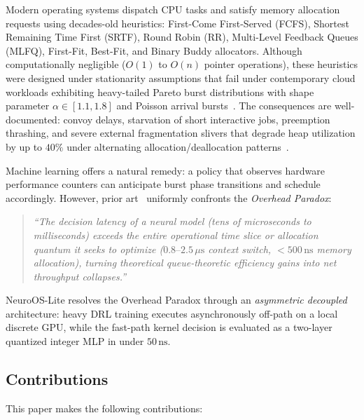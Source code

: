 Modern operating systems dispatch CPU tasks and satisfy memory allocation
requests using decades-old heuristics: First-Come First-Served (FCFS),
Shortest Remaining Time First (SRTF), Round Robin (RR), Multi-Level Feedback
Queues (MLFQ), First-Fit, Best-Fit, and Binary Buddy allocators. Although
computationally negligible ($O(1)$ to $O(n)$ pointer operations), these
heuristics were designed under stationarity assumptions that fail under
contemporary cloud workloads exhibiting heavy-tailed Pareto burst distributions
with shape parameter $\alpha \in [1.1, 1.8]$ and Poisson arrival
bursts~\cite{Tsafrir2007,Arpaci2018}. The consequences are well-documented:
convoy delays, starvation of short interactive jobs, preemption thrashing, and
severe external fragmentation slivers that degrade heap utilization by up to
$40\%$ under alternating allocation/deallocation
patterns~\cite{Wilson1995,Johnstone1998}.

Machine learning offers a natural remedy: a policy that observes hardware
performance counters can anticipate burst phase transitions and schedule
accordingly. However, prior art~\cite{Mao2019,Decima2019,Stratos2020}
uniformly confronts the \emph{Overhead Paradox}:

\begin{quote}
\textit{``The decision latency of a neural model (tens of microseconds to
milliseconds) exceeds the entire operational time slice or allocation quantum
it seeks to optimize ($0.8\text{--}2.5\,\mu\text{s}$ context switch,
$<500\,\text{ns}$ memory allocation), turning theoretical queue-theoretic
efficiency gains into net throughput collapses.''}
\end{quote}

NeuroOS-Lite resolves the Overhead Paradox through an \textit{asymmetric
decoupled} architecture: heavy DRL training executes asynchronously off-path on
a local discrete GPU, while the fast-path kernel decision is evaluated as a
two-layer quantized integer MLP in under $50\,\text{ns}$.

\subsection*{Contributions}

This paper makes the following contributions:


